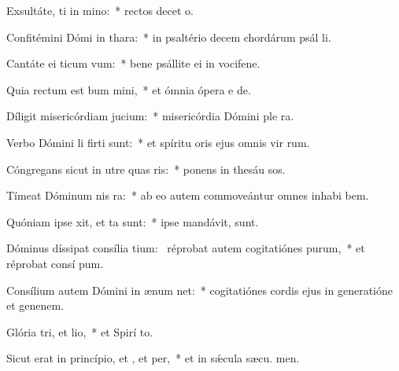 \item Exsultáte, ti in mino:~* rectos decet o.
\item Confitémini Dómi in thara:~* in psaltério decem chordárum psál li.
\item Cantáte ei ticum vum:~* bene psállite ei in vocifene.
\item Quia rectum est bum mini,~* et ómnia ópera e  de.
\item Díligit misericórdiam  jucium:~* misericórdia Dómini ple  ra.
\item Verbo Dómini li firti sunt:~* et spíritu oris ejus omnis vir rum.
\item Cóngregans sicut in utre quas ris:~* ponens in thesáu sos.
\item Tímeat Dóminum nis ra:~* ab eo autem commoveántur omnes inhabi bem.
\item Quóniam ipse xit, et ta sunt:~* ipse mandávit,   sunt.
\item Dóminus díssipat consília tium:~\pscross{} réprobat autem cogitatiónes purum,~* et réprobat consí pum.
\item Consílium autem Dómini in ænum net:~* cogitatiónes cordis ejus in generatióne et genenem.
\item Glória tri, et lio,~* et Spirí to.
\item Sicut erat in princípio, et , et per,~* et in sǽcula sæcu. men.
